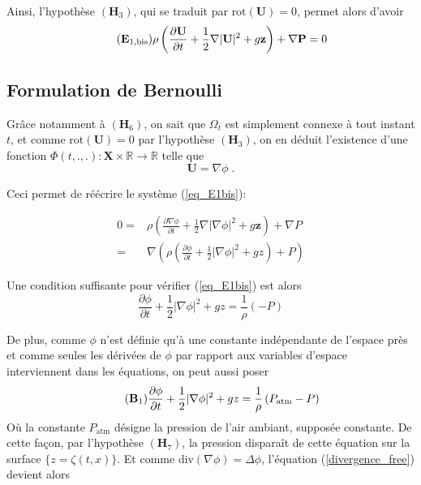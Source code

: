\documentclass[12pt,a4paper]{article}
\newcommand{\rot}{\text{rot}}
\numberwithin{equation}{section}
\begin{document}
Ainsi, l'hypothèse $(\textbf{H}_3)$, qui se traduit par $\rot(\textbf{U})=0$, permet alors d'avoir 
\begin{equation} \tag{$\textbf{E}_{1,\text{bis}}$} \label{eq_E1bis}
        \rho \left( \frac{\partial \textbf{U}}{\partial t} +\frac{1}{2}\nabla  |\textbf{U}|^2 +  g\textbf{z}\right) + \nabla \textbf{P} = 0 
\end{equation}

\subsection{Formulation de Bernoulli}

Grâce notamment à $(\textbf{H}_6)$, on sait que $\Omega_t$ est simplement connexe à tout instant $t$, et comme $\rot(\textbf{U}) = 0$ par l'hypothèse $(\textbf{H}_3)$, on en déduit l'existence d'une fonction $\Phi(t,.,.): \textbf{X}\times \mathbb{R} \rightarrow \mathbb{R}$ telle que $$\textbf{U} = \nabla \phi  \;.$$    

Ceci permet de réécrire le système (\ref{eq_E1bis}):

\begin{align*}
    0 = &\rho \left ( \frac{\partial \nabla \phi }{\partial t} +\frac{1}{2}\nabla  |\nabla \phi|^2  +  g\textbf{z} \right)+ \nabla P 
    \\
    =&\nabla \left ( \rho \left ( \frac{\partial \phi }{\partial t} +\frac{1}{2}|\nabla \phi|^2 +  gz \right) + P \right)
\end{align*}

Une condition suffisante pour vérifier (\ref{eq_E1bis}) est alors
\begin{equation*} 
  \frac{\partial \phi }{\partial t} +\frac{1}{2}|\nabla \phi|^2 +  gz   = \frac{1}{\rho}\left( - P\right)
\end{equation*}



De plus, comme $\phi$ n'est définie qu'à une constante indépendante de l'espace près et comme seules les dérivées de $\phi$ par rapport aux variables d'espace interviennent dans les équations, on peut aussi poser
\begin{equation} \tag{$\textbf{B}_1$} \label{eq_B1}
  \frac{\partial \phi }{\partial t} +\frac{1}{2}|\nabla \phi|^2 +  gz   = \frac{1}{\rho}\left(P_\text{atm} - P\right)
\end{equation}
Où la constante $P_\text{atm}$ désigne la pression de l'air ambiant, supposée constante. De cette façon, par l'hypothèse $(\textbf{H}_7)$, la pression disparaît de cette équation sur la surface $\{z = \zeta(t,x)\}$.
Et comme $\text{div}(\nabla \phi) = \Delta \phi$, l'équation (\ref{divergence_free}) devient alors
\end{document}
